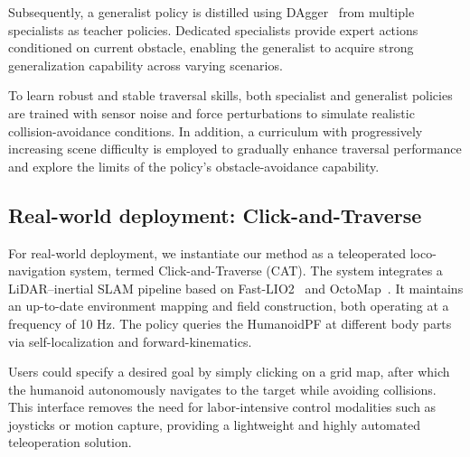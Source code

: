 Subsequently, a generalist policy is distilled using DAgger~\cite{ross2011reduction} from multiple specialists as teacher policies. Dedicated specialists provide expert actions conditioned on current obstacle, enabling the generalist to acquire strong generalization capability across varying scenarios.

To learn robust and stable traversal skills, both specialist and generalist policies are trained with sensor noise and force perturbations to simulate realistic collision-avoidance conditions. In addition, a curriculum with progressively increasing scene difficulty is employed to gradually enhance traversal performance and explore the limits of the policy’s obstacle-avoidance capability.

\subsection{Real-world deployment: Click-and-Traverse}
\label{sec:click_and_traverse}
For real-world deployment, we instantiate our method as a teleoperated loco-navigation system, termed Click-and-Traverse (CAT). The system integrates a LiDAR–inertial SLAM pipeline based on Fast-LIO2~\cite{xu2021fastlio2fastdirectlidarinertial} and OctoMap~\cite{hornung13auro}. It maintains an up-to-date environment mapping and field construction, both operating at a frequency of 10 Hz. The policy queries the HumanoidPF at different body parts via self-localization and forward-kinematics. 

Users could specify a desired goal by simply clicking on a grid map, after which the humanoid autonomously navigates to the target while avoiding collisions. This interface removes the need for labor-intensive control modalities such as joysticks or motion capture, providing a lightweight and highly automated teleoperation solution.






